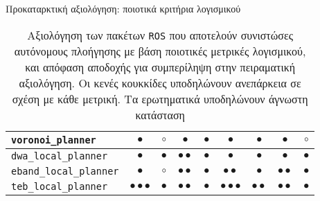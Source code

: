 \begin{frame}{Προκαταρκτική αξιολόγηση: ποιοτικά κριτήρια λογισμικού}
{\begin{table}[h]
\begin{tabular}{lccccccc|c}
  \texttt{voronoi\_planner}            & $\bullet$                 & $\circ$     & $\bullet$         & $\bullet$ & $\bullet$               & $\bullet$        & $\bullet$               & $\circ$      \\ \midrule
  \texttt{dwa\_local\_planner}         & $\bullet$                 & $\bullet$   & $\bullet\bullet$  & $\bullet$ & $\bullet$               & $\bullet$        & $\bullet$               & $\bullet$    \\
  \texttt{eband\_local\_planner}       & $\bullet$                 & $\circ$     & $\bullet\bullet$  & $\bullet$ & $\bullet\bullet$        & $\bullet$        & $\bullet\bullet$        & $\bullet$    \\
  \texttt{teb\_local\_planner}         & $\bullet\bullet\bullet$   & $\bullet$   & $\bullet\bullet$  & $\bullet$ & $\bullet\bullet\bullet$ & $\bullet\bullet$ & $\bullet\bullet$        & $\bullet$    \\ \bottomrule
\end{tabular}
\caption{\scriptsize Αξιολόγηση των πακέτων \texttt{ROS} που αποτελούν
         συνιστώσες αυτόνομους πλοήγησης με βάση ποιοτικές μετρικές
         λογισμικού, και απόφαση αποδοχής για συμπερίληψη στην πειραματική
         αξιολόγηση. Οι κενές κουκκίδες υποδηλώνουν ανεπάρκεια σε σχέση με
         κάθε μετρική. Τα ερωτηματικά υποδηλώνουν άγνωστη κατάσταση}
\end{table}
}

\end{frame}
